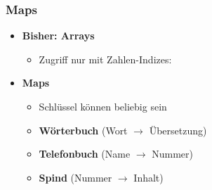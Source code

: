\documentclass{../../presentation}
\begin{document}
%

\begin{frame}[fragile]
	\frametitle{Maps}
	\begin{itemize}
		\item \textbf{Bisher: Arrays}
		      \begin{itemize}
			      \item Zugriff nur mit Zahlen-Indizes:
		      \end{itemize}
		\item\pause \textbf{Maps}
		      \begin{itemize}
			      \item Schlüssel können beliebig sein
			      \item \textbf{Wörterbuch} (Wort $\to$ Übersetzung)
			      \item \textbf{Telefonbuch} (Name $\to$ Nummer)
			      \item \textbf{Spind} (Nummer $\to$ Inhalt)
		      \end{itemize}
	\end{itemize}
\end{frame}
\end{document}
